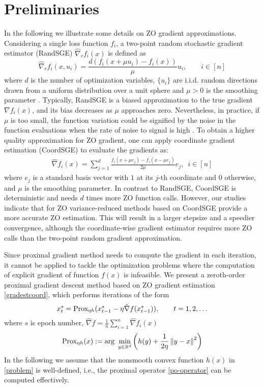 \section{Preliminaries}
In the following we illustrate some details on ZO gradient approximations.
Considering a single loss function $f_i$, a two-point random stochastic gradient estimator (RandSGE) $\hat{\nabla}_r f_i(x)$ is defined as \cite{nesterov2017random,gao2018information}
\begin{equation}\label{gradestrand}
\hat{\nabla}_r f_i(x, u_i) = \frac{d(f_i(x+\mu u_i) - f_i(x))}{\mu}u_i,\qquad i\in [n]
\end{equation}
where $d$ is the number of optimization variables, $\{u_i\}$ are i.i.d. random directions drawn from a uniform distribution over a unit sphere and $\mu > 0$ is the smoothing parameter  \cite{flaxman2005online,shamir2017optimal,gao2018information}. Typically, RandSGE is a biased approximation to the true gradient $\nabla f_i(x)$, and its bias decreases as $\mu$ approaches zero. Nevertheless, in practice, if $\mu$ is too small, the function variation
could be signified by the noise in the function evaluations when the rate of noise to signal is high  
 \cite{lian2016comprehensive}.
To obtain a higher quality approximation for ZO gradient, one can apply coordinate gradient estimation (CoordSGE) \cite{gu2018inexact,gu2018faster,liu2018zeroth} to evaluate the gradients as:
\begin{align}\label{gradestcoord}
\hat{\nabla} f_i(x) = \sum_{j=1}^d \frac{f_i(x+\mu e_j) - f_i(x-\mu e_j)}{2\mu}e_j,\,\,\,i\in [n]
\end{align}
where  $e_j$ is a standard basis vector with $1$ at its $j$-th coordinate and $0$ otherwise, and $\mu$ is the smoothing parameter. In contrast to RandSGE, CoordSGE is deterministic and needs $d$ times more ZO function calls. 
However, our studies indicate that for ZO variance-reduced methods based on CoordSGE provide a more accurate ZO estimation. This will result in a
larger stepsize and a speedier convergence, although the coordinate-wise gradient estimator
requires more ZO calls than the two-point random gradient approximation. 

Since proximal gradient method needs to compute the gradient in each iteration, it cannot be applied to tackle the optimization problems where the computation of explicit gradient of function $f(x)$ is infeasible.
We present a zeroth-order proximal gradient descent method based on ZO gradient estimation \eqref{gradestcoord}, which performs iterations of the form
\begin{equation}
x_{t}^s= \text{Prox}_{\eta h}(x_{t-1}^s - \eta \hat{\nabla} f(x_{t-1}^s)),\qquad t=1, 2, \ldots
\end{equation}
where $s$ is epoch number, $\hat{\nabla} f=\frac{1}{n}\sum_{i=1}^n \hat{\nabla} f_i(x)$
\begin{equation}\label{po-operator}
\Po_{\eta h}(x) := \text{arg}\,\,\min_{y\in\R^d}\left(h(y)+\frac{1}{2\eta}\norm{y-x}^2\right)
\end{equation}
In the following we assume that the
nonsmooth convex function $h(x)$ in \eqref{problem} is well-defined, i.e., the proximal operator \eqref{po-operator} can be computed effectively.

